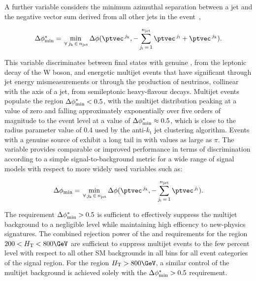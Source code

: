 A further variable considers the minimum azimuthal separation between
a jet and the negative vector \ptvec sum derived from all other jets
in the event~\cite{RA1Paper}, 

\begin{equation}
  \bdphi = \min_{\,\forall\, j_\text{k} \,\in\, \njet}
  \Delta\phi(\ptvec^{\,j_\text{k}}, -\sum_{j_\text{i}\, =\, 1}^{\njet}
  \ptvec^{\,j_\text{i}} + \ptvec^{\,j_\text{k}}).   
  \label{eq:bdphi}
\end{equation}

This variable discriminates between final states with genuine
\ptvecmiss, \eg from the leptonic decay of the W boson, and energetic
multijet events that have significant \ptvecmiss through jet energy
mismeasurements or through the production of neutrinos, collinear with
the axis of a jet, from semileptonic heavy-flavour decays. Multijet
events populate the region $\mbox{$\Delta\phi^{*}_{\rm min}$} < 0.5$, with the multijet
distribution peaking at a value of zero and falling approximately
exponentially over five orders of magnitude to the event level at a
value of $\mbox{$\Delta\phi^{*}_{\rm min}$} \approx 0.5$, which is close to the radius parameter
value of 0.4 used by the anti-$k_\text{t}$ jet clustering
algorithm. Events with a genuine source of \ptvecmiss exhibit a long
tail in \bdphi with values as large as $\pi$. The \bdphi variable
provides comparable or improved performance in terms of discrimination
according to a simple signal-to-background metric for a wide range of
signal models with respect to more widely used variables such as:

\begin{equation}
  \Delta\phi_\text{min} = \min_{\,\forall\, j_\text{k} \,\in\, \njet}
  \Delta\phi(\ptvec^{\,j_\text{k}}, -\sum_{j_\text{i}\, =\, 1}^{\njet}
  \ptvec^{\,j_\text{i}}).
  \label{eq:dphi}
\end{equation}


The requirement $\mbox{$\Delta\phi^{*}_{\rm min}$} > 0.5$ is sufficient to effectively suppress
the multijet background to a negligible level while maintaining high
efficency to new-physics signatures. The combined rejection power of
the \alphat and \bdphi requirements for the region $200 < \scalht <
800\GeV$ are sufficient to suppress multijet events to the few percent
level with respect to all other SM backgrounds in all \scalht bins for
all event categories of the signal region. For the region $\scalht >
800\GeV$, a similar control of the multijet background is achieved
solely with the $\mbox{$\Delta\phi^{*}_{\rm min}$} > 0.5$
requirement. 


